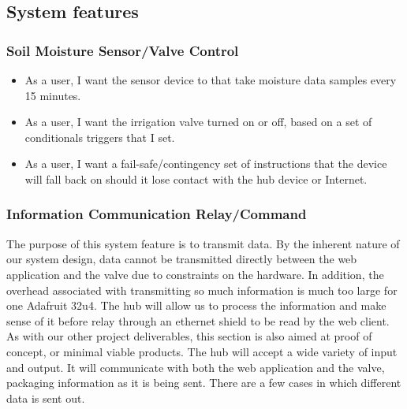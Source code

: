 \documentclass[onecolumn, draftclsnofoot,10pt, compsoc]{IEEEtran}
\newcounter{subsubsubsection}[subsubsection]
\begin{document}
    \subsection{System features}
      \subsubsection{Soil Moisture Sensor/Valve Control}
      \begin{itemize}
          \item{As a user, I want the sensor device to that take moisture data samples every 15 minutes.}
          \item{As a user, I want the irrigation valve turned on or off, based on a set of conditionals triggers that I set.}
          \item{As a user, I want a fail-safe/contingency set of instructions that the device will fall back on should it lose contact with the hub device or Internet.}
      \end{itemize}

      \subsubsection{Information Communication Relay/Command}
 	  The purpose of this system feature is to transmit data.
      By the inherent nature of our system design, data cannot be transmitted directly between the web application and the valve due to constraints on the hardware.
      In addition, the overhead associated with transmitting so much information is much too large for one Adafruit 32u4. 
      The hub will allow us to process the information and make sense of it before relay through an ethernet shield to be read by the web client. 
      As with our other project deliverables, this section is also aimed at proof of concept, or minimal viable products.
      The hub will accept a wide variety of input and output.
      It will communicate with both the web application and the valve, packaging information as it is being sent.
      There are a few cases in which different data is sent out.\par 
      
\end{document}
